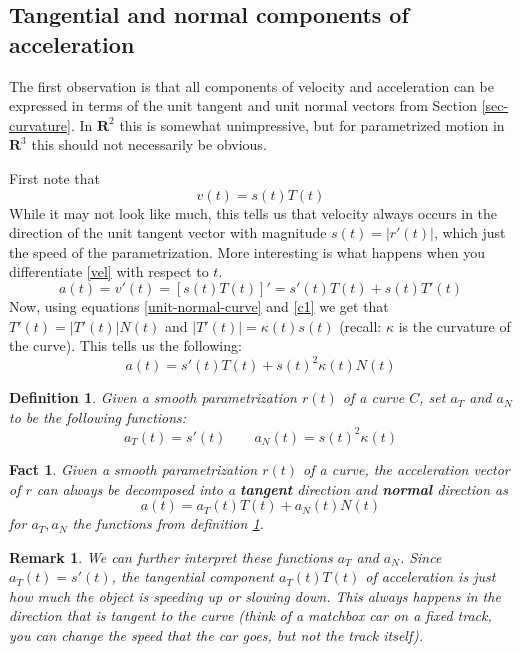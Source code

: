 \documentclass[12pt]{article}
\numberwithin{equation}{subsection}
\numberwithin{figure}{subsection}
\newtheorem{defn}[subsection]{Definition}
\newtheorem{fact}[subsection]{Fact}
\theoremstyle{note}
\newtheorem{remark}[subsection]{Remark}
\begin{document}
{\subsection{Tangential and normal components of acceleration} The first observation is that all components of velocity and acceleration can be expressed in terms of the  unit tangent and unit normal vectors from Section \ref{sec-curvature}. In $\mathbf{R}^2$ this is somewhat unimpressive, but for parametrized motion in $\mathbf{R}^3$ this should not necessarily be obvious.

First note that
\begin{equation} v(t)= s(t) T(t) \label{vel} \end{equation}
While it may not look like much, this tells us that velocity always occurs in the direction of the unit tangent vector with magnitude $s(t)=|r'(t)|$, which just the speed of the parametrization. More interesting is what happens when you differentiate \eqref{vel} with respect to $t$. 
\[a(t)=v'(t)=\left\lbrack s(t)T(t) \right\rbrack' = s'(t) T(t) + s(t) T'(t)  
\]
Now, using equations \eqref{unit-normal-curve} and \eqref{c1} we get that $T'(t)=|T'(t)| N(t)$ and $|T'(t)|=\kappa(t) s(t)$ (recall: $\kappa$ is the curvature of the curve). This tells us the following: 
\begin{equation} a(t) = s'(t) T(t) + s(t)^2 \kappa(t) N(t)\label{acc} \end{equation}
\begin{defn} \label{acc-tan-normal}	Given a smooth parametrization $r(t)$ of a curve $C$, set $a_T$ and $a_N$ to be the following functions: \begin{equation} a_T(t)=s'(t) \qquad a_N(t)=s(t)^2 \kappa(t)\end{equation}
\end{defn}

\begin{fact}
	Given a smooth parametrization $r(t)$ of a curve, the acceleration vector of $r$ can always be decomposed into a \textbf{tangent} direction and \textbf{normal} direction as \[ a(t)=a_T(t)T(t)+a_N(t)N(t)\]  for $a_T, a_N$ the functions from definition \ref{acc-tan-normal}.
\end{fact}

\begin{remark}
	We can further interpret these functions $a_T$ and $a_N$. Since $a_T(t)=s'(t)$, the \textit{tangential component} $a_T(t)T(t)$ of acceleration is just how much the object is speeding up or slowing down. This always happens in the direction that is tangent to the curve (think of a matchbox car on a fixed track, you can change the speed that the car goes, but not the track itself). 
	

\end{remark}}
\end{document}
